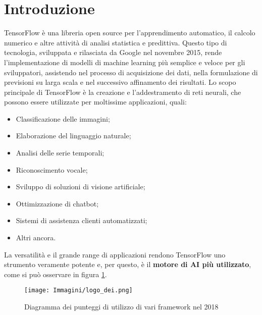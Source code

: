 \section{Introduzione}
TensorFlow è una libreria open source per l'apprendimento automatico, il calcolo numerico e altre attività di analisi statistica e predittiva. Questo
tipo di tecnologia, sviluppata e rilasciata da Google nel novembre 2015, rende l’implementazione di modelli di machine learning più semplice e veloce per
gli sviluppatori, assistendo nel processo di acquisizione dei dati, nella formulazione di previsioni su larga scala e nel successivo affinamento dei risultati.
Lo scopo principale di TensorFlow è la creazione e l’addestramento di reti neurali, che possono essere utilizzate per moltissime applicazioni, quali:
\begin{itemize}
    \item Classificazione delle immagini;
    \item Elaborazione del linguaggio naturale;
    \item Analisi delle serie temporali;
    \item Riconoscimento vocale;
    \item Sviluppo di soluzioni di visione artificiale;
    \item Ottimizzazione di chatbot;
    \item Sistemi di assistenza clienti automatizzati;
    \item Altri ancora.
\end{itemize}

La versatilità e il grande range di applicazioni rendono TensorFlow uno strumento veramente potente e, per questo, è il \textbf{motore di AI più utilizzato},
come si può osservare in figura \ref{fig:diagramma}.

\begin{figure}
    \centering
    \texttt{[image: Immagini/logo\_dei.png]}
    \caption{Diagramma dei punteggi di utilizzo di vari framework nel 2018}
    \label{fig:diagramma}
\end{figure}

